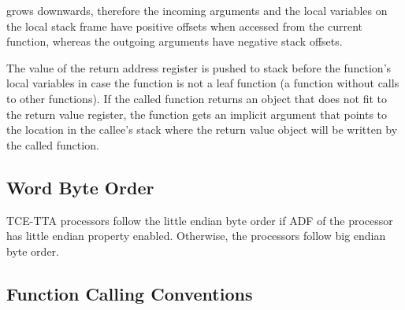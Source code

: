 \documentclass[a4paper,twoside]{tceusermanual}
\begin{document}
grows downwards, therefore the incoming arguments and the local variables on
the local stack frame have positive offsets when accessed from the current
function, whereas the outgoing arguments have negative stack offsets.


The value of the return address register is pushed to stack before the 
function's local variables in case the function is not a leaf function
(a function without calls to other functions). If the called function returns 
an object that does not fit to the return value register, the function 
gets an implicit argument that points to the location in the callee's 
stack where the return value object will be written by the called function. 

\subsection{Word Byte Order}
\label{ssec:word-order}

TCE-TTA processors follow the little endian byte order if ADF of the
processor has little endian property enabled. Otherwise, the processors
follow big endian byte order.

\subsection{Function Calling Conventions}
\label{ssec:calling-conventions}
\end{document}
